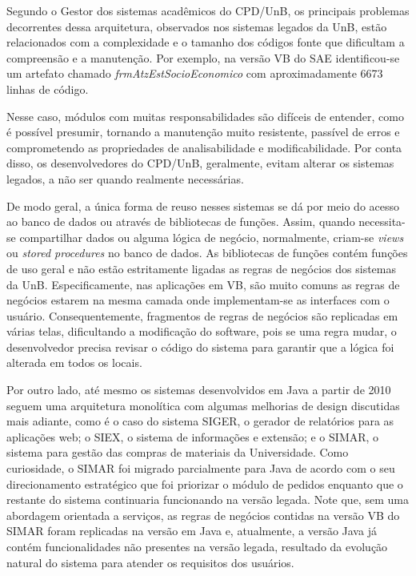 Segundo o Gestor dos sistemas acadêmicos do CPD/UnB, os principais problemas decorrentes dessa arquitetura, observados nos sistemas legados da \acrshort{UnB}, estão relacionados com a complexidade e o tamanho dos códigos fonte que dificultam a compreensão e a manutenção. Por exemplo, na versão VB do \acrshort{SAE} 
identificou-se um artefato chamado \emph{frmAtzEstSocioEconomico} com aproximadamente 6673 linhas de código. 

Nesse caso, módulos com muitas responsabilidades são difíceis de entender, como é possível presumir, tornando a manutenção muito resistente, passível de erros e comprometendo as propriedades de analisabilidade e modificabilidade. Por conta disso, os desenvolvedores do CPD/UnB, geralmente, evitam alterar os sistemas legados, a não ser quando realmente necessárias.

De modo geral, a única forma de reuso nesses sistemas se dá por meio do acesso ao banco de dados ou através de bibliotecas de funções. Assim, quando necessita-se compartilhar dados ou alguma lógica de negócio, normalmente, criam-se \textit{views} ou \textit{stored procedures} no banco de dados. As bibliotecas de funções contém funções de uso geral e não estão estritamente ligadas as regras de negócios dos sistemas da \acrshort{UnB}. Especificamente, nas aplicações em VB, são muito comuns as regras de negócios estarem na mesma camada onde implementam-se as interfaces com o usuário. Consequentemente, fragmentos de regras de negócios são replicadas em várias telas, dificultando a modificação do software, pois se uma regra mudar, o desenvolvedor precisa revisar o código do sistema para garantir que a lógica foi alterada em todos os locais. 

Por outro lado, até mesmo os sistemas desenvolvidos em Java a partir de 2010
seguem uma arquitetura monolítica com algumas melhorias de design discutidas mais adiante, como 
é o caso do sistema \acrshort{SIGER}, o gerador de relatórios para as aplicações web; o \acrshort{SIEX}, o sistema de informações e extensão; e o \acrshort{SIMAR}, o sistema para gestão das compras de materiais da Universidade. Como curiosidade, o \acrshort{SIMAR} foi migrado parcialmente para Java de acordo com o seu direcionamento estratégico que foi priorizar o módulo de pedidos enquanto que o restante do sistema continuaria funcionando na versão legada. Note que,
sem uma abordagem orientada a serviços, as regras de negócios contidas na versão VB do \acrshort{SIMAR} foram replicadas na versão em Java e, atualmente, a versão Java já contém funcionalidades
não presentes na versão legada, resultado da evolução natural do sistema para atender os 
requisitos dos usuários.



